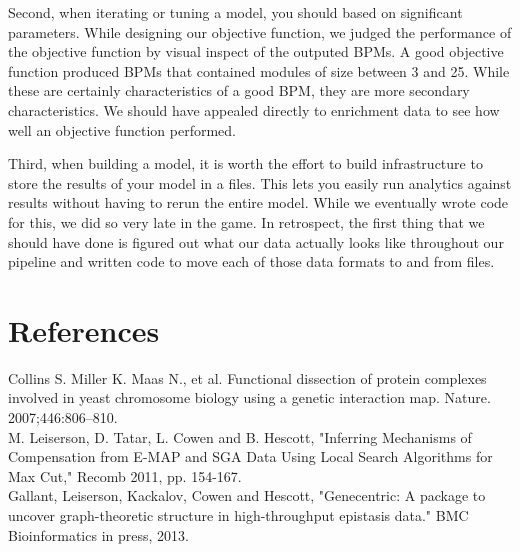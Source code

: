 \documentclass[11pt]{article}
\begin{document}
\par Second, when iterating or tuning a model, you should based on significant parameters. While designing our objective function, we judged the performance of the objective function by visual inspect of the outputed BPMs. A good objective function produced BPMs that contained modules of size between 3 and 25. While these are certainly characteristics of a good BPM, they are more secondary characteristics. We should have appealed directly to enrichment data to see how well an objective function performed. 
		
\par Third, when building a model, it is worth the effort to build infrastructure to store the results of your model in a files. This lets you easily run analytics against results without having to rerun the entire model. While we eventually wrote code for this, we did so very late in the game. In retrospect, the first thing that we should have done is figured out what our data actually looks like throughout our pipeline and written code to move each of those data formats to and from files.

		
	
  


\section{References}
Collins S. Miller K. Maas N., et al. Functional dissection of protein complexes involved in yeast chromosome biology using a genetic interaction map. Nature. 2007;446:806–810.\\

M. Leiserson, D. Tatar, L. Cowen and B. Hescott, "Inferring Mechanisms of Compensation from E-MAP and SGA Data Using Local Search Algorithms for Max Cut," Recomb 2011, pp. 154-167.\\

Gallant, Leiserson, Kackalov, Cowen and Hescott, "Genecentric: A package to uncover graph-theoretic structure in high-throughput epistasis data." BMC Bioinformatics in press, 2013.\\
\end{document}
